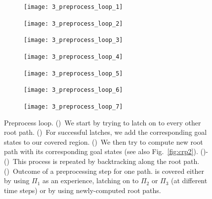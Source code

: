 \documentclass[a4paper]{report}
\begin{document}
\begin{figure}[t!]
    \centering
    \begin{subfigure}{.45\textwidth}
        \texttt{[image: 3\_preprocess\_loop\_1]}
        \caption{}
        \label{fig:pl1}
    \end{subfigure}
    \hspace{1mm}
    \begin{subfigure}{0.45\textwidth}
        \texttt{[image: 3\_preprocess\_loop\_2]}
        \caption{}
        \label{fig:pl2}
    \end{subfigure} 
    \hspace{1mm}
    \begin{subfigure}{0.45\textwidth}
        \texttt{[image: 3\_preprocess\_loop\_3]}
        \caption{}
        \label{fig:pl3}
    \end{subfigure}
    \hspace{1mm}
    \begin{subfigure}{.45\textwidth}
        \texttt{[image: 3\_preprocess\_loop\_4]}
        \caption{}
        \label{fig:pl4}
    \end{subfigure}
    \begin{subfigure}{0.45\textwidth}
        \texttt{[image: 3\_preprocess\_loop\_5]}
        \caption{}
        \label{fig:pl5}
    \end{subfigure}
    \hspace{1mm}
    \begin{subfigure}{0.45\textwidth}
        \texttt{[image: 3\_preprocess\_loop\_6]}
        \caption{}
        \label{fig:pl6}
    \end{subfigure}
    \hspace{1mm}
    \begin{subfigure}{0.45\textwidth}
        \texttt{[image: 3\_preprocess\_loop\_7]}
        \caption{}
        \label{fig:pl7}
    \end{subfigure}
    \caption{\CaptionTextSize
    Preprocess loop.
    ()~We start by trying to latch on to every other root path. 
    ()~For successful latches, we add the corresponding goal states to our covered region.
    ()~We then try to compute new root path with its corresponding goal states (see also Fig.~\ref{fig:crp2}).
    ()-()~This process is repeated by backtracking along the root path.
    ()~Outcome of a preprocessing step for one path. \Gfull is covered either by using $\Pi_1$ as an experience, 
    latching on to $\Pi_2$ or  $\Pi_3$ (at different time steps)
    or by 
    using newly-computed root paths. 
    }
    \label{fig:pl}
\end{figure}
\end{document}
